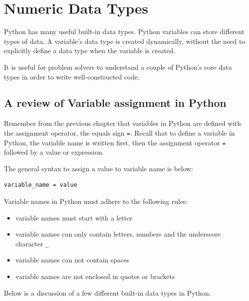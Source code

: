 \documentclass{book}
\providecommand{\tightlist}{%
      \setlength{\itemsep}{0pt}\setlength{\parskip}{0pt}}
\begin{document}
    




    
        \section{Numeric Data Types}\label{numeric-data-types}
    




    
        Python has many useful built-in data types. Python variables can store
different types of data. A variable's data type is created dynamically,
without the need to explicitly define a data type when the variable is
created.

It is useful for problem solvers to understand a couple of Python's core
data types in order to write well-constructed code.

\subsection{A review of Variable assignment in
Python}\label{a-review-of-variable-assignment-in-python}

Remember from the previous chapter that variables in Python are defined
with the assignment operator, the equals sign \lstinline!=!. Recall that
to define a variable in Python, the variable name is written first, then
the assignment operator \lstinline!=! followed by a value or expression.

The general syntax to assign a value to variable name is below:

\begin{lstlisting}
variable_name = value
\end{lstlisting}

Variable names in Python must adhere to the following rules:

\begin{itemize}
\tightlist
\item
  variable names must start with a letter
\item
  variable names can only contain letters, numbers and the underscore
  character \lstinline!_!
\item
  variable names can not contain spaces
\item
  variable names are not enclosed in quotes or brackets
\end{itemize}

Below is a discussion of a few different built-in data types in Python.
    
\end{document}
